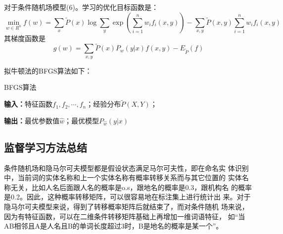 \documentclass[a4paper,UTF8,no-math]{ctexart}
\begin{document}
	    对于条件随机场模型(6)。学习的优化目标函数是：\begin{equation}
	    	\min_{w\in R^{n}} f(w)=\sum_{x}\tilde{P}(x)\log \sum_{y}\exp\left(\sum_{i=1}^{n}w_{i}f_{i}\left(x,y\right)\right)-\sum_{x,y}\tilde{P}(x,y)\sum_{i=1}^{n}w_{i}f_{i}\left(x,y\right) 
	    \end{equation}其梯度函数是\begin{equation}
	    	g(w)=\sum_{x,y}\tilde{P}(x)P_{w}(y|x)f(x,y)-E_{\tilde{P}}(f)
	    \end{equation}
	    
	    拟牛顿法的BFGS算法如下：
	    
	    \begin{algorithm}[htb]
	    	\caption{BFGS算法}
	    	\label{alg:viterbi}
	    	{\bf 输入：}特征函数$ f_{1},f_{2},\cdots,f_{n} $；经验分布$ \tilde{P}(X,Y) $；
	    	
	    	
	    	{\bf 输出：}最优参数值$ \hat{w} $；最优模型$ P_{\hat{w}}(y|x) $
	    	
	    	\begin{algorithmic}[1] 
	    	\end{algorithmic} 
	    	
	    \end{algorithm}

	
	\subsection{监督学习方法总结}
	
	条件随机场和隐马尔可夫模型都是假设状态满足马尔可夫性，即在命名实
	体识别中，当前词的实体名称和上一个实体名称有概率转移关系而与其它位置的
	实体名称无关，比如人名后面跟人名的概率是o.s，跟地名的概率是0.3，跟机构名
	的概率是0.2。因此，这种概率转移矩阵，可以很容易地在标注集上进行统计出
	来。对于隐马尔可夫模型来说，得到了转移概率矩阵后就结束了，而对条件随机
	场来说，因为有特征函数，可以在二维条件转移矩阵基础上再增加一维词语特征，
	如“当AB相邻且A是人名且B的单词长度超过3时，B是地名的概率是某一个”。
\end{document}
